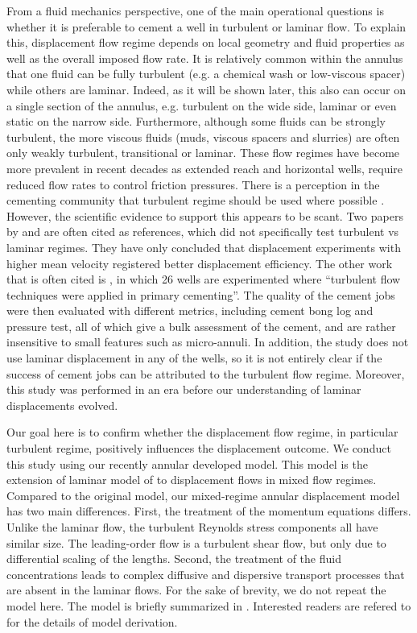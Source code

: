 \documentclass[review]{elsarticle}
\begin{document}
From a fluid mechanics perspective, one of the main operational questions is whether it is preferable to cement a well in turbulent or laminar flow. To explain this,  displacement flow regime depends on local geometry and fluid properties as well as the overall imposed flow rate. It is relatively common within the annulus that one fluid can be fully turbulent (e.g. a chemical wash or low-viscous spacer) while others are laminar. Indeed, as it will be shown later, this also can occur on a single section of the annulus, e.g. turbulent on the wide side, laminar or even static on the narrow side. Furthermore, although some fluids can be strongly turbulent, the more viscous fluids (muds, viscous spacers and slurries) are often only weakly turbulent, transitional or laminar. These flow regimes have become more prevalent in recent decades as extended reach and horizontal wells, require reduced flow rates to control friction pressures. There is a perception in the cementing community that turbulent regime should be used where possible \citep{Mclean1967,Sauer1987,kettl1993,nelson06,Lavrov2016,enayatpour2017}. However, the scientific evidence to support this appears to be scant. Two papers by \cite{howard1948} and \cite{smith1991} are often cited as references, which did not specifically test turbulent vs laminar regimes. They have only concluded that displacement experiments with higher mean velocity registered better displacement efficiency. The other work that is often cited is \cite{Brice1964}, in which 26 wells are experimented where ``turbulent flow techniques were applied in primary cementing''. The quality of the cement jobs were then evaluated with different metrics, including cement bong log and pressure test, all of which give a bulk assessment of the cement, and are rather insensitive to small features such as micro-annuli. In addition, the study does not use laminar displacement in any of the wells, so it is not entirely clear if the success of cement jobs can be attributed to the turbulent flow regime. Moreover, this study was performed in an era before our understanding of laminar displacements evolved. 

Our goal here is to confirm whether the displacement flow regime, in particular turbulent regime, positively influences the displacement outcome. We conduct this study using our recently  annular developed model\citep{Maleki2017}. This model is the extension of laminar model of \citet{Bittleston2002} to displacement flows in mixed flow regimes. Compared to the original model, our mixed-regime annular displacement model has two main differences. First, the treatment of the momentum equations differs. Unlike the laminar flow, the turbulent Reynolds stress
components all have similar size. The leading-order flow is a turbulent shear flow, but only due to differential scaling of the lengths. Second, the treatment of the fluid concentrations leads to complex diffusive and dispersive transport processes that are absent in the laminar flows. For the sake of brevity, we do not repeat the model here. The model is briefly summarized in \cite{Maleki2018c}. Interested readers are refered to \cite{Maleki2017} for the details of model derivation.
\end{document}
